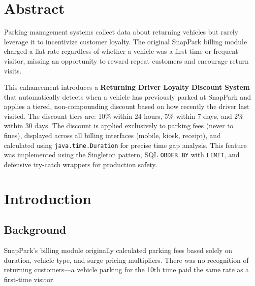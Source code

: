 \documentclass[12pt,a4paper]{article}
\begin{document}
\newpage
\section*{Abstract}

Parking management systems collect data about returning vehicles but rarely leverage it to incentivize customer loyalty. The original SnapPark billing module charged a flat rate regardless of whether a vehicle was a first-time or frequent visitor, missing an opportunity to reward repeat customers and encourage return visits.

This enhancement introduces a \textbf{Returning Driver Loyalty Discount System} that automatically detects when a vehicle has previously parked at SnapPark and applies a tiered, non-compounding discount based on how recently the driver last visited. The discount tiers are: 10\% within 24 hours, 5\% within 7 days, and 2\% within 30 days. The discount is applied exclusively to parking fees (never to fines), displayed across all billing interfaces (mobile, kiosk, receipt), and calculated using \texttt{java.time.Duration} for precise time gap analysis. This feature was implemented using the Singleton pattern, SQL \texttt{ORDER BY} with \texttt{LIMIT}, and defensive try-catch wrappers for production safety.

\newpage
\tableofcontents
\newpage

\section{Introduction}

\subsection{Background}
SnapPark's billing module originally calculated parking fees based solely on duration, vehicle type, and surge pricing multipliers. There was no recognition of returning customers---a vehicle parking for the 10th time paid the same rate as a first-time visitor.
\end{document}
